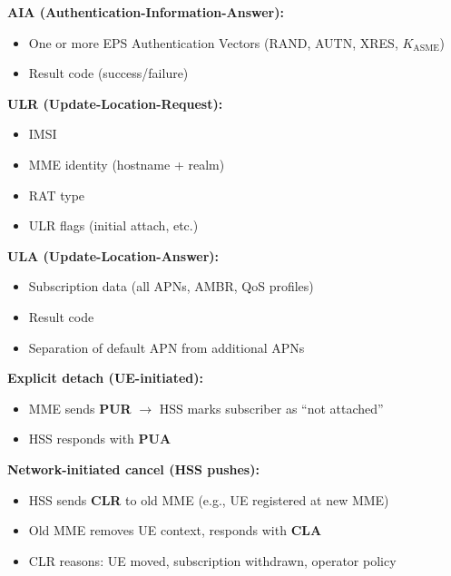 \textbf{AIA (Authentication-Information-Answer):}

\begin{itemize}
\tightlist
\item
  One or more EPS Authentication Vectors (RAND, AUTN, XRES, \ensuremath{K_{\mathrm{ASME}}})
\item
  Result code (success/\allowbreak{}failure)
\end{itemize}

\textbf{ULR (Update-Location-Request):}

\begin{itemize}
\tightlist
\item
  IMSI
\item
  MME identity (hostname + realm)
\item
  RAT type
\item
  ULR flags (initial attach, etc.)
\end{itemize}

\textbf{ULA (Update-Location-Answer):}

\begin{itemize}
\tightlist
\item
  Subscription data (all APNs, AMBR, QoS profiles)
\item
  Result code
\item
  Separation of default APN from additional APNs
\end{itemize}


\textbf{Explicit detach (UE-initiated):}

\begin{itemize}
\tightlist
\item
  MME sends \textbf{PUR} \ensuremath{\to} HSS marks subscriber as ``not attached''
\item
  HSS responds with \textbf{PUA}
\end{itemize}

\textbf{Network-initiated cancel (HSS pushes):}

\begin{itemize}
\tightlist
\item
  HSS sends \textbf{CLR} to old MME (e.g., UE registered at new MME)
\item
  Old MME removes UE context, responds with \textbf{CLA}
\item
  CLR reasons: UE moved, subscription withdrawn, operator policy
\end{itemize}

